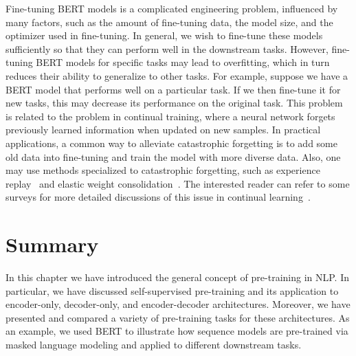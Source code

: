 Fine-tuning BERT models is a complicated engineering problem, influenced by many factors, such as the amount of fine-tuning data, the model size, and the optimizer used in fine-tuning. In general, we wish to fine-tune these models sufficiently so that they can perform well in the downstream tasks. However, fine-tuning BERT models for specific tasks may lead to overfitting, which in turn reduces their ability to generalize to other tasks. For example, suppose we have a BERT model that performs well on a particular task. If we then fine-tune it for new tasks, this may decrease its performance on the original task. This problem is related to the  problem in continual training, where a neural network forgets previously learned information when updated on new samples. In practical applications, a common way to alleviate catastrophic forgetting is to add some old data into fine-tuning and train the model with more diverse data. Also, one may use methods specialized to catastrophic forgetting, such as experience replay~\cite{rolnick-etal:2019experience} and elastic weight consolidation~\cite{kirkpatrick-etal:2017overcoming}. The interested reader can refer to some surveys for more detailed discussions of this issue in continual learning~\cite{parisi-etal:2019continual,wang-etal:2023comprehensive,wang-etal:2023comprehensive2}.


\section{Summary}

\noindent In this chapter we have introduced the general concept of pre-training in NLP. In particular, we have discussed self-supervised pre-training and its application to encoder-only, decoder-only, and encoder-decoder architectures. Moreover, we have presented and compared a variety of pre-training tasks for these architectures. As an example, we used BERT to illustrate how sequence models are pre-trained via masked language modeling and applied to different downstream tasks.

